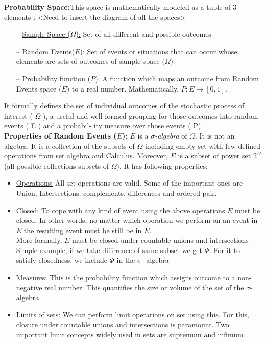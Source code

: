 \documentclass[12pt]{report} %
\begin{document}
	
	\noindent
	\textbf{Probability Space:}This space is mathematically modeled as a tuple of 3 elements : <Need to insert the diagram of all the spaces>
	\begin{itemize}[noitemsep,topsep=0pt]
		\item[--] \setul{1pt}{.4pt}\ul{Sample Space ($\Omega$):} Set of all different and possible outcomes
		 \item[--] \setul{1pt}{.4pt}\ul{Random Events($E$):} Set of events or situations that can occur whose elements are sets of outcomes of sample space ($\Omega$) 
		\item[--] \setul{1pt}{.4pt}\ul{Probability function ($P$):} A function which maps an outcome from Random Events space ($E$) to a real number. Mathematically, $P:E\rightarrow[0,1]$. 
	\end{itemize}
	 It formally defines the set of individual outcomes of the stochastic process of interest
	 ( $\Omega$ ), a useful and well-formed grouping for those
	 outcomes into random events ( E ) and a probabil-
	 ity measure over those events ( P)\\
	  
	\noindent
	\textbf{Properties of Random Events ($E$):} $E$ is a \textit{$\sigma$-algebra} of $\Omega$. It is not an algebra. It is a collection of the subsets of $\Omega$ including empty set with few defined operations from set algebra and Calculus. Moreover, $E$ is a subset of power set $2^{\Omega}$ (all possible collections subsets of $\Omega$).
	It has following properties:
		\begin{itemize}[noitemsep,topsep=0pt]
			\item \setul{1pt}{.4pt}\ul{Operations:} All set operations are valid. Some of the important ones are  Union, Intersections, complements, differences and ordered pair.  
			\item \setul{1pt}{.4pt}\ul{Closed:} To cope with any kind of event using the above operations $E$ must be closed. In other words, no matter which operation we perform on an event in $E$ the resulting event must be still be in $E$. \\ 
			\noindent
			More formally, $E$ must be closed under countable unions and intersections\\
			\noindent
			Simple example, if we take difference of same subset we get $\Phi$. For it to satisfy closedness, we include $\Phi$ in the $\sigma$ -algebra
			\item \setul{1pt}{.4pt}\ul{Measures:} This is the probability function which assigns outcome to a non-negative real number. This quantifies the size or volume of the set of the $\sigma$-algebra
			\item \setul{1pt}{.4pt}\ul{Limits of sets:}  We can perform limit operations on set using this. For this, closure under countable unions and intersections is paramount. Two important limit concepts widely used in sets are supremum and infimum  \\
		\end{itemize}
		
\end{document}
